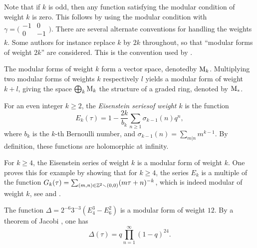 Note that if $k$ is odd, then any function satisfying the modular condition of weight $k$ is zero. This follows by using the modular condition with $\gamma = 
\bigl(\begin{smallmatrix}
 -1 & 0 \\
 0 & -1
\end{smallmatrix}\bigr).$
There are several alternate conventions for handling the weights $k$. Some authors for instance replace $k$ by $2k$ throughout, so that ``modular forms of weight $2k$'' are considered. This is the convention used by \cite{Serre1973}.

The modular forms of weight $k$ form a vector space, denoted\footnotemark by $\mathrm{M}_k$. Multiplying two modular forms of weights $k$ respectively $l$ yields a modular form of weight $k+l$, giving the space $\bigoplus_k \mathrm{M}_k$ the structure of a graded ring, denoted by $\mathrm{M}_{*}$.


\begin{expls} \label{ex:delta}
 For an even integer $k\geq 2$, the \emph{Eisenstein series\footnotemark of weight $k$} is the function \[E_k(\tau)=1-\frac{2k}{b_k}\sum_{n\geq 1}\sigma_{k-1}(n)q^n,\] where $b_k$ is the $k$-th Bernoulli number, and $\sigma_{k-1}(n)=\sum_{m|n}m^{k-1}$. By definition, these functions are holomorphic at infinity.
 
 For $k\geq 4$, the Eisenstein series of weight $k$ is a modular form of weight $k$. One proves this for example by showing that for $k\geq 4$, the series $E_k$ is a multiple of the function $G_k(\tau)=\sum_{(m,n)\in\mathbb{Z}^2\smallsetminus(0,0)}(m\tau+n)^{-k}$, which is indeed modular of weight $k$, see \cite[Ch.~VII, Prop.~8]{Serre1973} and \cite[Ch.~VII, 2.3]{Serre1973}.
 
 The function $\Delta=2^{-6}3^{-3}(E_4^3-E_6^2)$ is a modular form of weight $12$. By a theorem of Jacobi \cite[Ch.~VII, Thm.~6]{Serre1973}, one has \[\Delta(\tau)=q\prod_{n=1}^{\infty}(1-q)^{24}.\]
\end{expls}


